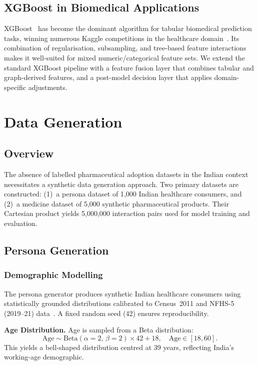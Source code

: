 \documentclass[10pt,journal,compsoc]{IEEEtran}
\begin{document}
\subsection{XGBoost in Biomedical Applications}

XGBoost~\cite{chen2016} has become the dominant algorithm for tabular biomedical
prediction tasks, winning numerous Kaggle competitions in the healthcare
domain~\cite{bojer2021}.
Its combination of regularisation, subsampling, and tree-based feature interactions
makes it well-suited for mixed numeric/categorical feature sets.
We extend the standard XGBoost pipeline with a feature fusion layer that combines
tabular and graph-derived features, and a post-model decision layer that applies
domain-specific adjustments.

\section{Data Generation}
\label{sec:data}

\subsection{Overview}

The absence of labelled pharmaceutical adoption datasets in the Indian context
necessitates a synthetic data generation approach.
Two primary datasets are constructed: (1)~a persona dataset of 1{,}000 Indian
healthcare consumers, and (2)~a medicine dataset of 5{,}000 synthetic pharmaceutical
products.
Their Cartesian product yields 5{,}000{,}000 interaction pairs used for model training
and evaluation.

\subsection{Persona Generation}

\subsubsection{Demographic Modelling}

The persona generator produces synthetic Indian healthcare consumers using
statistically grounded distributions calibrated to Census~2011 and NFHS-5
(2019--21) data~\cite{iips2022}.
A fixed random seed (42) ensures reproducibility.

\textbf{Age Distribution.}
Age is sampled from a Beta distribution:
\begin{equation}
  \text{Age} \sim \mathrm{Beta}(\alpha{=}2,\,\beta{=}2)\times 42 + 18,
  \quad \text{Age}\in[18,60].
  \label{eq:age}
\end{equation}
This yields a bell-shaped distribution centred at 39 years, reflecting India's
working-age demographic.
\end{document}
